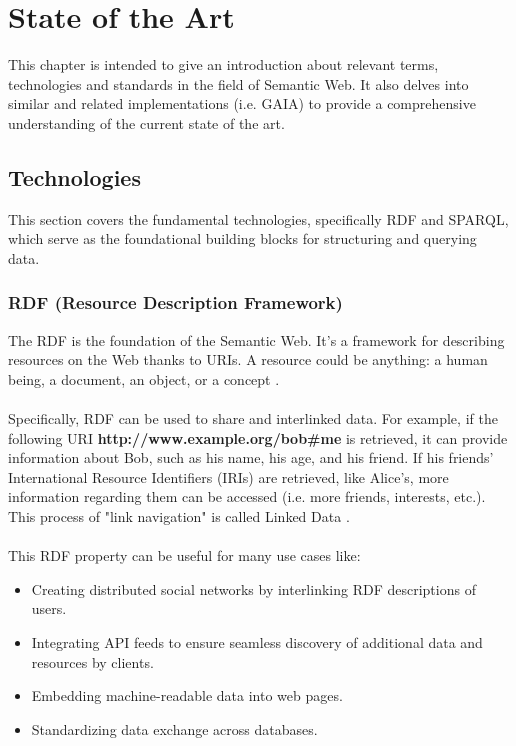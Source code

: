 \chapter{State of the Art\label{cha:chapter2}}

This chapter is intended to give an introduction about relevant terms, technologies and standards in the field of Semantic Web. It also delves into similar and related implementations (i.e. GAIA) to provide a comprehensive understanding of the current state of the art.

\section{Technologies \label{sec:tech}}

This section covers the fundamental technologies, specifically RDF and SPARQL, which serve as the foundational building blocks for structuring and querying data.

\subsection{RDF (Resource Description Framework)\label{sec:rdf_primer}}

The RDF is the foundation of the Semantic Web. It's a framework for describing resources on the Web thanks to URIs. A resource could be anything: a human being, a document, an object, or a concept \cite{rdf}. 
\\
\\
Specifically, RDF can be used to share and interlinked data. For example, if the following URI \space \textbf{http://www.example.org/bob\#me} is retrieved, it can provide information about Bob, such as his name, his age, and his friend.
If his friends' International Resource Identifiers (IRIs) are retrieved, like Alice's, more information regarding them can be accessed (i.e. more friends, interests, etc.). This process of "link navigation" is called Linked Data \cite{rdf}.
\\
\\
This RDF property can be useful for many use cases like: 
\begin{itemize}
	\item Creating distributed social networks by interlinking RDF descriptions of users.
	\item Integrating API feeds to ensure seamless discovery of additional data and resources by clients.
	\item Embedding machine-readable data into web pages.
	\item Standardizing data exchange across databases.
\end{itemize}

